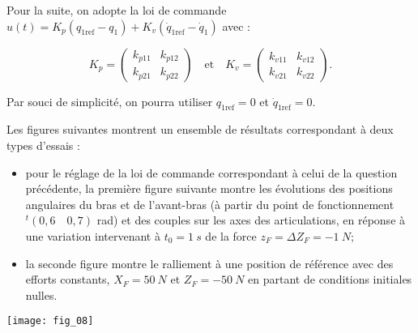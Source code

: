 Pour la suite, on adopte la loi de commande $u(t)=K_p \left(q_{1\text{ref}}-q_1\right)+K_v \left(\dot{q}_{1\text{ref}}-\dot{q}_1\right)$ avec :

$$
K_p = \begin{pmatrix} 
k_{p11} & k_{p12} \\
k_{p21} & k_{p22}
\end{pmatrix}
\quad
\text{et}
\quad 
K_v = \begin{pmatrix} 
k_{v11} & k_{v12} \\
k_{v21} & k_{v22}
\end{pmatrix}.
$$

Par souci de simplicité, on pourra utiliser $q_{1\text{ref}}=0$ et $\dot{q}_{1\text{ref}}=0$.



\ifprof
\begin{corrige}
\end{corrige}
\else
\fi


Les figures suivantes montrent un ensemble de résultats correspondant à deux types d’essais :
\begin{itemize}
\item pour le réglage de la loi de commande correspondant à celui de la question précédente, la première figure suivante montre les évolutions des positions angulaires du bras et de l’avant-bras (à partir du point de fonctionnement $ ^t(0,6 \quad 0,7)$ rad)
et des couples sur les axes des articulations, en réponse à une variation intervenant à $t_0 = \SI{1}{s}$ de la force $z_F = \Delta Z_F = -\SI{1}{N}$;
\item la seconde figure montre le ralliement à une position de référence avec des efforts constants, $X_F = \SI{50}{N}$ et $Z_F = -\SI{50}{N}$ en partant de conditions initiales nulles.
\end{itemize}
\ifprof
\begin{corrige}
\end{corrige}
\else
\fi



\begin{center}
\texttt{[image: fig\_08]}
\end{center}
